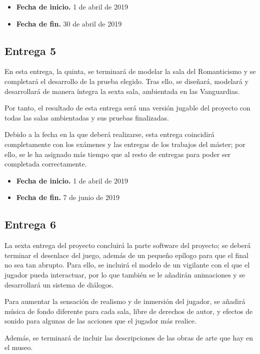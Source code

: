 \begin{itemize}
    \item \textbf{Fecha de inicio.} 1 de abril de 2019
    \item \textbf{Fecha de fin.} 30 de abril de 2019
\end{itemize}

\subsection{Entrega 5}

En esta entrega, la quinta, se terminará de modelar la sala del Romanticismo y se completará el desarrollo de la prueba elegido. Tras ello, se diseñará, modelará y desarrollará de manera íntegra la sexta sala, ambientada en las Vanguardias.

Por tanto, el resultado de esta entrega será una versión jugable del proyecto con todas las salas ambientadas y sus pruebas finalizadas.

Debido a la fecha en la que deberá realizarse, esta entrega coincidirá completamente con los exámenes y las entregas de los trabajos del máster; por ello, se le ha asignado más tiempo que al resto de entregas para poder ser completada correctamente.

\begin{itemize}
    \item \textbf{Fecha de inicio.} 1 de abril de 2019
    \item \textbf{Fecha de fin.} 7 de junio de 2019
\end{itemize}


\subsection{Entrega 6}

La sexta entrega del proyecto concluirá la parte software del proyecto; se deberá terminar el desenlace del juego, además de un pequeño epílogo para que el final no sea tan abrupto. Para ello, se incluirá el modelo de un vigilante con el que el jugador pueda interactuar, por lo que también se le añadirán animaciones y se desarrollará un sistema de diálogos. 

Para aumentar la sensación de realismo y de inmersión del jugador, se añadirá música de fondo diferente para cada sala, libre de derechos de autor, y efectos de sonido para algunas de las acciones que el jugador más realice. 

Además, se terminará de incluir las descripciones de las obras de arte que hay en el museo.

